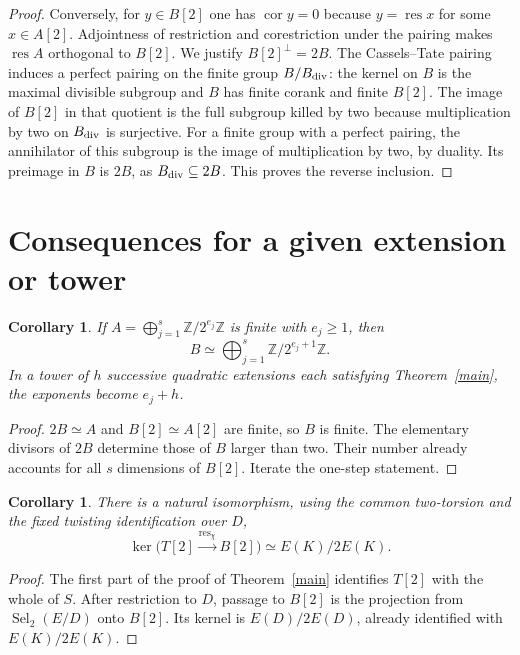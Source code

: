 \documentclass[11pt]{article}
\newtheorem{corollary}[theorem]{Corollary}
\newcommand{\Sel}{\operatorname{Sel}}
\newcommand{\res}{\operatorname{res}}
\newcommand{\cor}{\operatorname{cor}}
\begin{document}
\begin{proof}
Conversely, for $y\in B[2]$ one has $\cor y=0$ because $y=\res x$ for
some $x\in A[2]$. Adjointness of restriction and corestriction under
the pairing \cite[Cor.~4.9]{MS} makes $\res A$ orthogonal to $B[2]$.
We justify $B[2]^\perp=2B$. The Cassels--Tate pairing induces a perfect
pairing on the finite group $B/B_{\rm div}$: the kernel on $B$ is the
maximal divisible subgroup and $B$ has finite corank and finite $B[2]$.
The image of $B[2]$ in that quotient is the full subgroup killed by
two because multiplication by two on $B_{\rm div}$ is surjective. For
a finite group with a perfect pairing, the annihilator of this subgroup
is the image of multiplication by two, by duality. Its preimage in $B$
is $2B$, as $B_{\rm div}\subseteq2B$. This proves the reverse inclusion.
\end{proof}

\section{Consequences for a given extension or tower}
\begin{corollary}
If $A=\bigoplus_{j=1}^{s}\mathbb Z/2^{e_j}\mathbb Z$ is finite with
$e_j\ge1$, then
\[
 B\simeq\bigoplus_{j=1}^{s}\mathbb Z/2^{e_j+1}\mathbb Z.
\]
In a tower of $h$ successive quadratic extensions each satisfying
Theorem~\ref{main}, the exponents become $e_j+h$.
\end{corollary}
\begin{proof}
$2B\simeq A$ and $B[2]\simeq A[2]$ are finite, so $B$ is finite.
The elementary divisors of $2B$ determine those of $B$ larger than two.
Their number already accounts for all $s$ dimensions of $B[2]$.
Iterate the one-step statement.
\end{proof}

\begin{corollary}
There is a natural isomorphism, using the common two-torsion and the
fixed twisting identification over $D$,
\[
 \ker\bigl(T[2]\xrightarrow{\res_\chi}B[2]\bigr)
                  \simeq E(K)/2E(K).
\]
\end{corollary}
\begin{proof}
The first part of the proof of Theorem~\ref{main} identifies
$T[2]$ with the whole of $S$. After restriction to $D$, passage to
$B[2]$ is the projection from $\Sel_2(E/D)$ onto $B[2]$. Its kernel
is $E(D)/2E(D)$, already identified with $E(K)/2E(K)$.
\end{proof}
\end{document}
